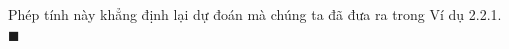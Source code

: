 \begin{minipage}[t]{0.71\textwidth}
    \vspace{0.4em}
    \noindent Phép tính này khẳng định lại dự đoán mà chúng ta đã đưa ra trong Ví dụ 2.2.1.\hfill{\color{stewartcyan}$\blacksquare$}

\end{minipage}
